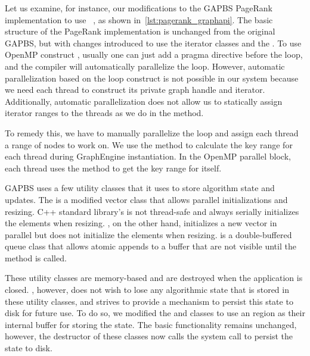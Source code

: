 Let us examine, for instance, our modifications to the \ac{GAPBS} PageRank implementation to 
use ~\api{}, as shown in~\autoref{lst:pagerank_graphapi}.
The basic structure of the PageRank implementation is unchanged from the original \ac{GAPBS}, but with changes introduced to use the iterator classes and the \api{}.
To use OpenMP construct , usually one can just add a pragma directive before the loop, and the compiler will automatically parallelize the loop.
However, automatic parallelization based on the loop construct is not possible in our system because we need each thread to construct its private graph handle and iterator.
Additionally, automatic parallelization does not allow us to statically assign iterator ranges to the threads as we do in the  method.

To remedy this, we have to manually parallelize the loop and assign each thread a range of nodes to work on.
We use the  method to calculate the key range for each thread during GraphEngine instantiation. 
In the OpenMP parallel block, each thread uses the  method to get the key range for itself.

\ac{GAPBS} uses a few utility classes that it uses to store algorithm state and updates.
The  is a modified vector class that allows parallel initializations and resizing.
C++ standard library's  is not thread-safe and always serially initializes the elements when resizing. 
, on the other hand, initializes a new vector in parallel but does not initialize the elements when resizing.
 is a double-buffered queue class that allows atomic appends to a buffer that are not visible until the  method is called.

These utility classes are memory-based and are destroyed when the application is closed.
\project{}, however,  does not wish to lose any algorithmic state that is stored in these utility classes, and strives to provide a mechanism to persist this state to disk for future use.
To do so, we modified the  and  classes to use an  region as their internal buffer for storing the state.
The basic functionality remains unchanged, however, the destructor of these classes now calls the  system call to persist the state to disk.